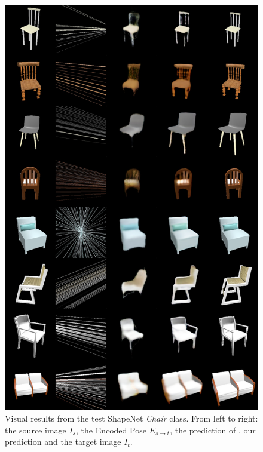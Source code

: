 \begin{figure}[htp!]
    \begin{center}
    \includegraphics[width=.9\textwidth]{images/epipolarnvs/SuppMat_Chair.jpg}
    \end{center}
     \caption{Visual results from the test ShapeNet \cite{Shapenet} \textit{Chair} class. From left to right: the source image  $I_s$, the Encoded Pose $E_{s\xrightarrow{}t}$,  the prediction of \cite{NVS_skip}, our prediction and the target image $I_t$.}
     \label{fig:add_visChair}
\end{figure}

